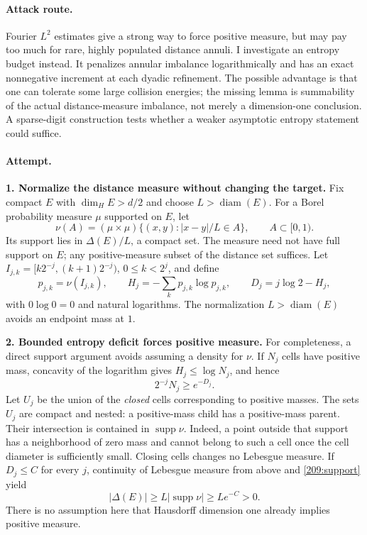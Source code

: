 \documentclass[11pt,a4paper]{article}
\begin{document}
\paragraph{Attack route.}
Fourier $L^2$ estimates give a strong way to force positive measure, but may
pay too much for rare, highly populated distance annuli. I investigate an
entropy budget instead. It penalizes annular imbalance logarithmically and
has an exact nonnegative increment at each dyadic refinement. The possible
advantage is that one can tolerate some large collision energies; the
missing lemma is summability of the actual distance-measure imbalance,
not merely a dimension-one conclusion. A sparse-digit construction tests
whether a weaker asymptotic entropy statement could suffice.

\paragraph{Attempt.}
\textbf{1. Normalize the distance measure without changing the target.}
Fix compact $E$ with $\dim_H E>d/2$ and choose $L>\operatorname{diam}(E)$.
For a Borel probability measure $\mu$ supported on $E$, let
\[
 \nu(A)=(\mu\times\mu)\{(x,y): |x-y|/L\in A\},\qquad A\subset[0,1).
\]
Its support lies in $\Delta(E)/L$, a compact set. The measure need not have
full support on $E$; any positive-measure subset of the distance set suffices.
Let $I_{j,k}=[k2^{-j},(k+1)2^{-j})$, $0\le k<2^j$, and define
\[
 p_{j,k}=\nu(I_{j,k}),\qquad
 H_j=-\sum_k p_{j,k}\log p_{j,k},\qquad
 D_j=j\log2-H_j,
\]
with $0\log0=0$ and natural logarithms. The normalization $L>\operatorname{diam}(E)$
avoids an endpoint mass at $1$.

\textbf{2. Bounded entropy deficit forces positive measure.}
For completeness, a direct support argument avoids assuming a density for
$\nu$. If $N_j$ cells have positive mass, concavity of the logarithm gives
$H_j\le\log N_j$, and hence
\begin{equation}\label{209:support}
 2^{-j}N_j\ge e^{-D_j}.
\end{equation}
Let $U_j$ be the union of the \emph{closed} cells corresponding to positive
masses. The sets $U_j$ are compact and nested: a positive-mass child has a
positive-mass parent. Their intersection is contained in $\operatorname{supp}\nu$.
Indeed, a point outside that support has a neighborhood of zero mass and
cannot belong to such a cell once the cell diameter is sufficiently small.
Closing cells changes no Lebesgue measure. If $D_j\le C$ for every $j$,
continuity of Lebesgue measure from above and \eqref{209:support} yield
\begin{equation}\label{209:positive}
 |\Delta(E)|\ge L|\operatorname{supp}\nu|\ge Le^{-C}>0.
\end{equation}
There is no assumption here that Hausdorff dimension one already implies
positive measure.
\end{document}
